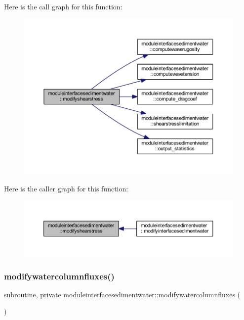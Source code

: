 Here is the call graph for this function\+:\nopagebreak
\begin{figure}[H]
\begin{center}
\leavevmode
\includegraphics[width=350pt]{namespacemoduleinterfacesedimentwater_a959fd8b47379cd24947cb35417c1563e_cgraph}
\end{center}
\end{figure}
Here is the caller graph for this function\+:\nopagebreak
\begin{figure}[H]
\begin{center}
\leavevmode
\includegraphics[width=350pt]{namespacemoduleinterfacesedimentwater_a959fd8b47379cd24947cb35417c1563e_icgraph}
\end{center}
\end{figure}
\mbox{\label{namespacemoduleinterfacesedimentwater_a052aa500f3fe487c32cb93f8c5a8ea60}} 
\subsubsection{\texorpdfstring{modifywatercolumnfluxes()}{modifywatercolumnfluxes()}}
{\footnotesize\ttfamily subroutine, private moduleinterfacesedimentwater\+::modifywatercolumnfluxes (\begin{DoxyParamCaption}{ }\end{DoxyParamCaption})\hspace{0.3cm}{\ttfamily [private]}}

